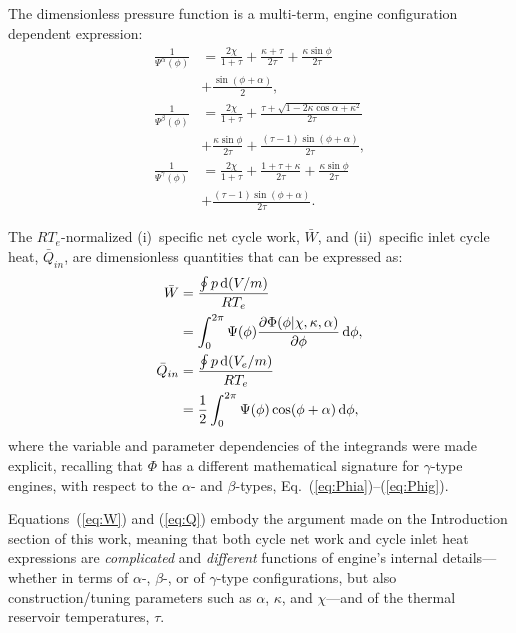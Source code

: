    The  dimensionless  pressure  function  is  a  multi-term,  engine   configuration dependent
    expression:
    \begin{align}
        \label{eq:Psia}
        \frac{1}{\Psi^{\alpha}(\phi)} &=
                \frac{2\chi}{1 + \tau} +
                \frac{\kappa + \tau}{2\tau} +
                \frac{\kappa\sin\phi}{2\tau} \nonumber\\
            &+  \frac{\sin(\phi + \alpha)}{2},\\
        \label{eq:Psib}
        \frac{1}{\Psi^{\beta}(\phi)}  &=
                \frac{2\chi}{1 + \tau} +
                \frac{\tau + \sqrt{1 - 2\kappa\cos\alpha + \kappa^2}}{2\tau} \nonumber\\
            &+  \frac{\kappa\sin\phi}{2\tau} +
                \frac{(\tau - 1)\sin(\phi + \alpha)}{2\tau},\\
        \label{eq:Psig}
        \frac{1}{\Psi^{\gamma}(\phi)} &=
                \frac{2\chi}{1 + \tau} +
                \frac{1 + \tau + \kappa}{2\tau} +
                \frac{\kappa\sin\phi}{2\tau} \nonumber\\
            &+  \frac{(\tau - 1)\sin(\phi + \alpha)}{2\tau}.
    \end{align}

    The $RT_e$-normalized (i)~specific net cycle work, $\bar{W}$, and (ii)~specific inlet  cycle
    heat, $\bar{Q}_{in}$, are dimensionless quantities that can be expressed as:
    \begin{align}
        \label{eq:W}
        \bar{W} &= \frac{\oint p\,\mathrm{d}(V/m)}{RT_e} \nonumber\\
                &= \int_0^{2\pi} \Psi(\phi)
                   \frac{\partial\Phi(\phi | \chi, \kappa, \alpha)}{\partial\phi}\,\mathrm{d}\phi,\\
        \label{eq:Q}
        \bar{Q}_{in} &= \frac{\oint p\,\mathrm{d}(V_e/m)}{RT_e} \nonumber\\
                     &= \frac{1}{2} \int_0^{2\pi} \Psi(\phi)
                        \cos(\phi + \alpha) \,\mathrm{d}\phi,
    \end{align}
    \noindent where the  variable  and  parameter  dependencies  of  the  integrands  were  made
    explicit, recalling that $\Phi$ has a different  mathematical  signature  for  $\gamma$-type
    engines,      with      respect      to      the      $\alpha$-      and      $\beta$-types,
    Eq.~(\ref{eq:Phia})--(\ref{eq:Phig}).

    Equations~(\ref{eq:W}) and (\ref{eq:Q}) embody the argument made on the Introduction section
    of this work, meaning that both  cycle  net  work  and  cycle  inlet  heat  expressions  are
    \emph{complicated} and \emph{different} functions of engine's internal details---whether  in
    terms   of   $\alpha$-,   $\beta$-,   or   of   $\gamma$-type   configurations,   but   also
    construction/tuning parameters such as $\alpha$, $\kappa$, and $\chi$---and of  the  thermal
    reservoir temperatures, $\tau$.


